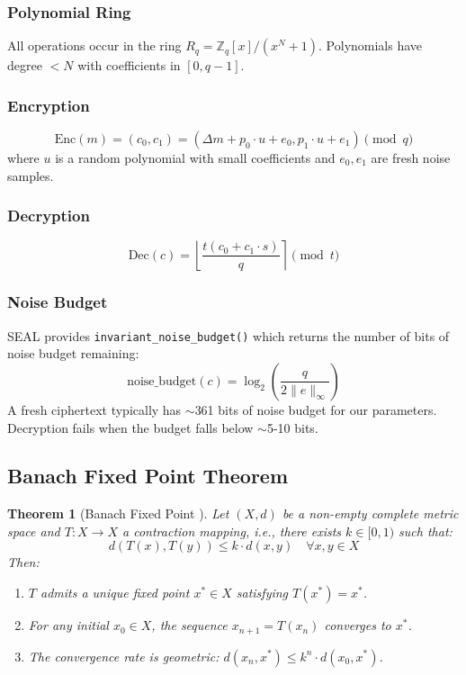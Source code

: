\documentclass[11pt]{article}
\newtheorem{theorem}{Theorem}
\begin{document}
\subsubsection{Polynomial Ring}
All operations occur in the ring $R_q = \mathbb{Z}_q[x]/(x^N + 1)$. Polynomials have degree $< N$ with coefficients in $[0, q-1]$.

\subsubsection{Encryption}
\begin{equation}
\text{Enc}(m) = (c_0, c_1) = (\Delta m + p_0 \cdot u + e_0, p_1 \cdot u + e_1) \pmod q
\end{equation}
where $u$ is a random polynomial with small coefficients and $e_0, e_1$ are fresh noise samples.

\subsubsection{Decryption}
\begin{equation}
\text{Dec}(c) = \left\lfloor \frac{t(c_0 + c_1 \cdot s)}{q} \right\rceil \pmod t
\end{equation}

\subsubsection{Noise Budget}
SEAL provides \texttt{invariant\_noise\_budget()} which returns the number of bits of noise budget remaining:
\begin{equation}
\text{noise\_budget}(c) = \log_2\left(\frac{q}{2\|e\|_\infty}\right)
\end{equation}
A fresh ciphertext typically has $\sim$361 bits of noise budget for our parameters. Decryption fails when the budget falls below $\sim$5-10 bits.

\subsection{Banach Fixed Point Theorem}

\begin{theorem}[Banach Fixed Point \cite{banach1922}]
Let $(X, d)$ be a non-empty complete metric space and $T: X \to X$ a contraction mapping, i.e., there exists $k \in [0, 1)$ such that:
\begin{equation}
d(T(x), T(y)) \leq k \cdot d(x, y) \quad \forall x, y \in X
\end{equation}
Then:
\begin{enumerate}
    \item $T$ admits a unique fixed point $x^* \in X$ satisfying $T(x^*) = x^*$.
    \item For any initial $x_0 \in X$, the sequence $x_{n+1} = T(x_n)$ converges to $x^*$.
    \item The convergence rate is geometric: $d(x_n, x^*) \leq k^n \cdot d(x_0, x^*)$.
\end{enumerate}
\end{theorem}
\end{document}
